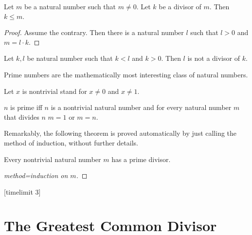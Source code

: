 \documentclass{article}
\begin{document}
\begin{forthel}
\begin{lemma}
Let $m$ be a natural number such that $m \neq 0$.
Let $k$ be a divisor of $m$.
Then $k \leq m$.
\end{lemma}
\begin{proof}
Assume the contrary.
Then there is a natural number $l$ such that
$l > 0$ and $m = l \cdot k$.
\end{proof}

\begin{proposition}
Let $k,l$ be natural number such that $k < l$ and $k > 0$.
Then $l$ is not a divisor of $k$.
\end{proposition}

\end{forthel}
%
Prime numbers are the mathematically most interesting
class of natural numbers.
%
\begin{forthel}
Let $x$ is nontrivial stand for $x \neq 0$ and $x \neq 1$.

\begin{definition}
$n$ is prime iff $n$ is a nontrivial natural number and
for every natural number $m$ that divides $n$ $m = 1$ or $m = n$.
\end{definition}
\end{forthel}
%
Remarkably, the following theorem is proved automatically by
just calling the method of induction, without further details.
%
\begin{forthel}
[timelimit 10]
\begin{theorem}
Every nontrivial natural number $m$ has a prime divisor.
\end{theorem}
\begin{proof}[method=induction on $m$]
\end{proof}
[timelimit 3]
\end{forthel}

\section{The Greatest Common Divisor}
\end{document}
